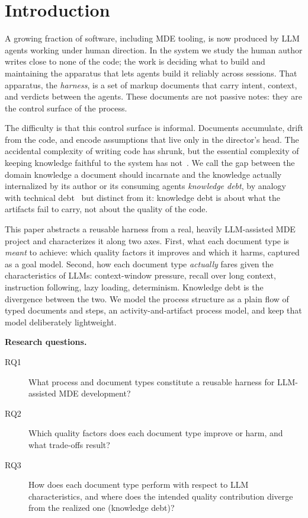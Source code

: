 \documentclass[sigconf]{acmart}
\begin{document}

\maketitle

\section{Introduction}
A growing fraction of software, including MDE tooling, is now produced by LLM agents working under human direction. In the system we study the human author writes close to none of the code; the work is deciding what to build and maintaining the apparatus that lets agents build it reliably across sessions. That apparatus, the \emph{harness}, is a set of markup documents that carry intent, context, and verdicts between the agents. These documents are not passive notes: they are the control surface of the process.

The difficulty is that this control surface is informal. Documents accumulate, drift from the code, and encode assumptions that live only in the director's head. The accidental complexity of writing code has shrunk, but the essential complexity of keeping knowledge faithful to the system has not~\cite{brooks1987silverbullet}. We call the gap between the domain knowledge a document should incarnate and the knowledge actually internalized by its author or its consuming agents \emph{knowledge debt}, by analogy with technical debt~\cite{cunningham1992wycash,kruchten2012techdebt} but distinct from it: knowledge debt is about what the artifacts fail to carry, not about the quality of the code.

This paper abstracts a reusable harness from a real, heavily LLM-assisted MDE project and characterizes it along two axes. First, what each document type is \emph{meant} to achieve: which quality factors it improves and which it harms, captured as a goal model. Second, how each document type \emph{actually} fares given the characteristics of LLMs: context-window pressure, recall over long context, instruction following, lazy loading, determinism. Knowledge debt is the divergence between the two. We model the process structure as a plain flow of typed documents and steps, an activity-and-artifact process model, and keep that model deliberately lightweight.

\smallskip
\noindent\textbf{Research questions.}
\begin{description}
\item[RQ1] What process and document types constitute a reusable harness for LLM-assisted MDE development?
\item[RQ2] Which quality factors does each document type improve or harm, and what trade-offs result?
\item[RQ3] How does each document type perform with respect to LLM characteristics, and where does the intended quality contribution diverge from the realized one (knowledge debt)?
\end{description}
\end{document}
